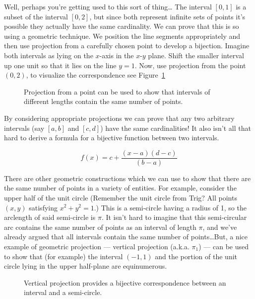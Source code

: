 Well, perhaps you're getting used to this sort of thing\ldots   
The interval $[0, 1]$ is a subset of the interval $[0, 2]$, 
but since both represent infinite sets of points
it's possible they actually have the same cardinality.  
We can prove that this is so using a geometric technique. 
We position the line segments appropriately
and then use projection from a carefully chosen point to 
develop a bijection.  Imagine both intervals as lying on 
the $x$-axis in the $x$-$y$ plane. Shift the
smaller interval up one unit so that it lies on the line 
$y = 1$.  Now, use projection
from the point $(0, 2)$, to visualize the correspondence 
see Figure~\ref{fig:equiv_intervals}

\begin{figure}[!hbtp]

\caption[Equivalent intervals.]{Projection from a point can be %
used to show that intervals of %
different lengths contain the same number of points.}
\label{fig:equiv_intervals} 
\end{figure}


By considering appropriate projections we can prove that any two arbitrary
intervals (say $[a, b]$ and $[c, d]$) have the same cardinalities!  It also
isn't all that hard to derive a formula for a bijective function between two
intervals.

\[ f(x) = c + \frac{(x - a)(d - c)}{(b - a)} \]

There are other geometric constructions which we can use to show that
there are the same number of points in a variety of entities.  For example,
consider the upper half of the unit circle (Remember the unit circle from
Trig?  All points $(x, y)$ satisfying $x^2 + y^2 = 1$.)  This is a 
semi-circle having a radius of 1, so the arclength of said semi-circle 
is $\pi$. It isn't hard to imagine
that this semi-circular arc contains the same number of points as an interval
of length $\pi$, and we've already argued that all intervals contain the same
number of points\ldots   But, a nice example of geometric projection ---  
vertical projection (a.k.a. $\pi_1$) ---  can be used to show that 
(for example) the interval
$(-1, 1)$ and the portion of the unit circle lying in the upper 
half-plane are equinumerous.

\begin{figure}[!hbtp]

\caption[An interval is equivalent to a semi-circle.]{Vertical projection %
provides a bijective correspondence between an interval and a semi-circle. }
\label{fig:interval_n_semicircle} 
\end{figure}

